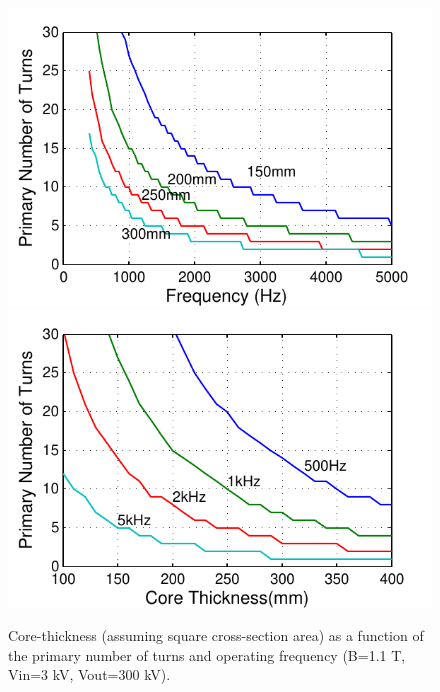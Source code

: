 \documentclass[a4paper, 11pt]{article} %
\begin{document}
\begin{figure}[]
  \centering
    \includegraphics[]{primary_Nturns_core}
    \includegraphics[]{primary_Nturns_freq}
  \caption{Core-thickness (assuming square cross-section area) as a function of the primary number of turns and operating frequency (B=1.1 T, Vin=3 kV, Vout=300 kV).}
  \label{core_dimensions}
\end{figure}
\end{document}
